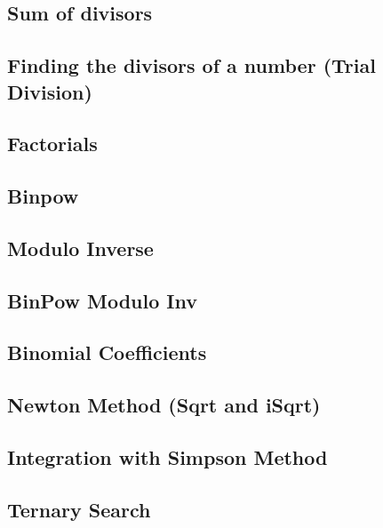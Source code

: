\documentclass[10pt]{article}
\begin{document}
\begin{multicols*}{2}
\subsection{Sum of divisors}


\subsection{Finding the divisors of a number (Trial Division)}


\subsection{Factorials}


\subsection{Binpow}

\subsection{Modulo Inverse}


\subsection{BinPow Modulo Inv}

\subsection{Binomial Coefficients}

\subsection{Newton Method (Sqrt and iSqrt)}

\subsection{Integration with Simpson Method}

\subsection{Ternary Search}


\end{multicols*}
\end{document}
